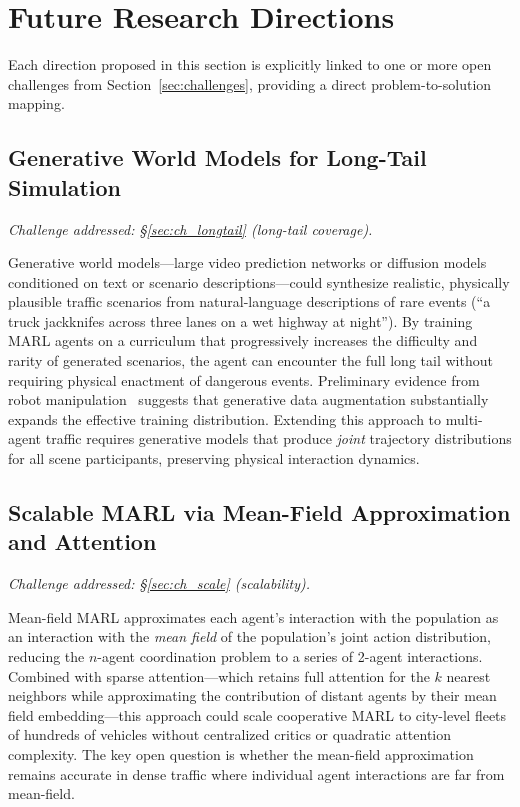 \documentclass[12pt, a4paper]{article}
\begin{document}
\section{Future Research Directions}
\label{sec:future}

Each direction proposed in this section is explicitly linked to one or more
open challenges from Section~\ref{sec:challenges}, providing a direct
problem-to-solution mapping.

\subsection{Generative World Models for Long-Tail Simulation}

\textit{Challenge addressed: \S\ref{sec:ch_longtail} (long-tail coverage).}

Generative world models---large video prediction networks or diffusion models
conditioned on text or scenario descriptions---could synthesize realistic,
physically plausible traffic scenarios from natural-language descriptions of
rare events (``a truck jackknifes across three lanes on a wet highway at night'').
By training MARL agents on a curriculum that progressively increases the
difficulty and rarity of generated scenarios, the agent can encounter the
full long tail without requiring physical enactment of dangerous events.
Preliminary evidence from robot manipulation~\cite{tobin2017domain} suggests
that generative data augmentation substantially expands the effective training
distribution.  Extending this approach to multi-agent traffic requires
generative models that produce \emph{joint} trajectory distributions for all
scene participants, preserving physical interaction dynamics.

\subsection{Scalable MARL via Mean-Field Approximation and Attention}

\textit{Challenge addressed: \S\ref{sec:ch_scale} (scalability).}

Mean-field MARL approximates each agent's interaction with the population
as an interaction with the \emph{mean field} of the population's joint action
distribution, reducing the $n$-agent coordination problem to a series of
2-agent interactions.  Combined with sparse attention---which retains
full attention for the $k$ nearest neighbors while approximating the contribution
of distant agents by their mean field embedding---this approach could scale
cooperative MARL to city-level fleets of hundreds of vehicles without centralized
critics or quadratic attention complexity.  The key open question is whether
the mean-field approximation remains accurate in dense traffic where
individual agent interactions are far from mean-field.
\end{document}
